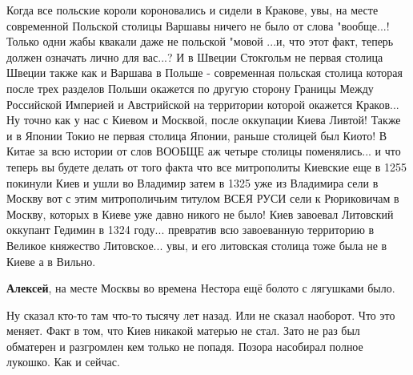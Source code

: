 \begin{itemize}
\begin{itemize}
Когда все польские короли короновались и сидели в Кракове, увы, на месте
современной Польской столицы Варшавы ничего не было от слова "вообще...! Только
одни жабы квакали даже не польской "мовой ...и, что этот факт, теперь должен
означать лично для вас...? И в Швеции Стокгольм не первая столица Швеции также
как и Варшава в Польше - современная польская столица которая после трех
разделов Польши окажется по другую сторону Границы Между Российской Империей и
Австрийской на территории которой окажется Краков... Ну точно как у нас с
Киевом и Москвой, после оккупации Киева Ливтой! Также и в Японии Токио не
первая столица Японии, раньше столицей был Киото! В Китае за всю истории от
слов ВООБЩЕ аж четыре столицы поменялись... и что теперь вы будете делать от
того факта что все митрополиты Киевские еще в 1255 покинули Киев и ушли во
Владимир затем в 1325 уже из Владимира сели в Москву вот с этим митрополичьим
титулом ВСЕЯ РУСИ сели к Рюриковичам в Москву, которых в Киеве уже давно никого
не было! Киев завоевал Литовский оккупант Гедимин в 1324 году... превратив всю
завоеванную территорию в Великое княжество Литовское... увы, и его литовская
столица тоже была не в Киеве а в Вильно.

\textbf{Алексей}, на месте Москвы во времена Нестора ещё болото с лягушками было.

\end{itemize} %


Ну сказал кто-то там что-то тысячу лет назад. Или не сказал наоборот. Что это
меняет. Факт в том, что Киев никакой матерью не стал. Зато не раз был обматерен
и разгромлен кем только не попадя. Позора насобирал полное лукошко. Как и
сейчас.



\end{itemize}
